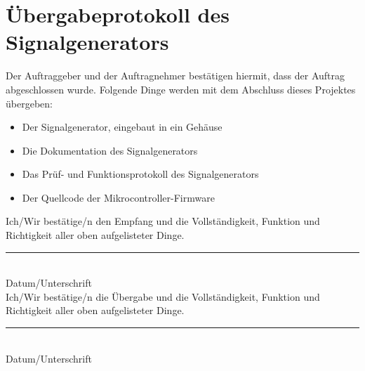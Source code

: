 \section[Übergabeprotokoll]{Übergabeprotokoll des Signalgenerators}
\bigskip
Der Auftraggeber und der Auftragnehmer bestätigen hiermit, dass der Auftrag abgeschlossen wurde. Folgende Dinge werden mit dem Abschluss dieses Projektes übergeben:
\begin{itemize}
\item Der Signalgenerator, eingebaut in ein Gehäuse
\item Die Dokumentation des Signalgenerators
\item Das Prüf- und Funktionsprotokoll des Signalgenerators
\item Der Quellcode der Mikrocontroller-Firmware
\end{itemize}
\bigskip
\bigskip
\bigskip
Ich/Wir bestätige/n den Empfang und die Vollständigkeit, Funktion und Richtigkeit aller oben aufgelisteter Dinge.\\

\rule{5cm}{0.5mm}\\
Datum/Unterschrift\\

Ich/Wir bestätige/n die Übergabe und die Vollständigkeit, Funktion und Richtigkeit aller oben aufgelisteter Dinge.\\
\rule{5cm}{0.5mm}\\
Datum/Unterschrift
